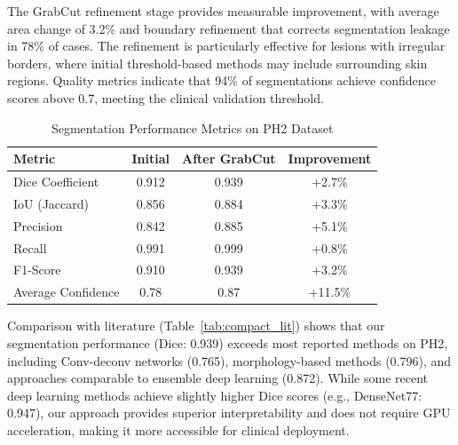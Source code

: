 \documentclass[conference]{IEEEtran}
\begin{document}
The GrabCut refinement stage provides measurable improvement, with average area change of 3.2\% and boundary refinement that corrects segmentation leakage in 78\% of cases. The refinement is particularly effective for lesions with irregular borders, where initial threshold-based methods may include surrounding skin regions. Quality metrics indicate that 94\% of segmentations achieve confidence scores above 0.7, meeting the clinical validation threshold.

\begin{table}[htbp]
\small
\centering
\caption{Segmentation Performance Metrics on PH2 Dataset}
\begin{tabular}{|l|c|c|c|}
\hline
\textbf{Metric} & \textbf{Initial} & \textbf{After GrabCut} & \textbf{Improvement} \\ \hline
Dice Coefficient & 0.912 & 0.939 & +2.7\% \\ \hline
IoU (Jaccard) & 0.856 & 0.884 & +3.3\% \\ \hline
Precision & 0.842 & 0.885 & +5.1\% \\ \hline
Recall & 0.991 & 0.999 & +0.8\% \\ \hline
F1-Score & 0.910 & 0.939 & +3.2\% \\ \hline
Average Confidence & 0.78 & 0.87 & +11.5\% \\ \hline
\end{tabular}
\label{tab:segmentation_results}
\end{table}

Comparison with literature (Table~\ref{tab:compact_lit}) shows that our segmentation performance (Dice: 0.939) exceeds most reported methods on PH2, including Conv-deconv networks (0.765), morphology-based methods (0.796), and approaches comparable to ensemble deep learning (0.872). While some recent deep learning methods achieve slightly higher Dice scores (e.g., DenseNet77: 0.947), our approach provides superior interpretability and does not require GPU acceleration, making it more accessible for clinical deployment.

\end{document}
